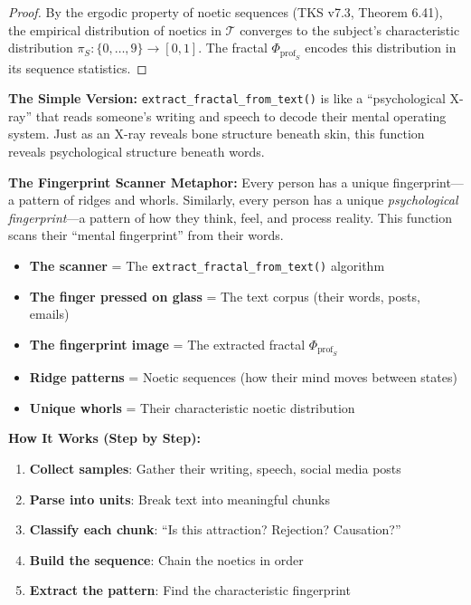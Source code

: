 \documentclass[11pt,twoside]{book}
\newcommand{\ProfileFrac}{\Phi_{\mathrm{prof}}}
\newcommand{\TextCorpus}{\mathcal{T}}
\begin{document}
\begin{proof}
By the ergodic property of noetic sequences (TKS v7.3, Theorem 6.41), the empirical
distribution of noetics in $\TextCorpus$ converges to the subject's characteristic
distribution $\pi_S : \{0, \ldots, 9\} \to [0,1]$. The fractal $\ProfileFrac_S$ encodes
this distribution in its sequence statistics.
\end{proof}

\begin{tcolorbox}[colback=green!5!white,colframe=green!65!black,title=\textbf{Plain English: The ``Mind-Reading Machine''},breakable]

\textbf{The Simple Version:}
\texttt{extract\_fractal\_from\_text()} is like a ``psychological X-ray'' that reads someone's
writing and speech to decode their mental operating system. Just as an X-ray reveals bone
structure beneath skin, this function reveals psychological structure beneath words.

\textbf{The Fingerprint Scanner Metaphor:}
Every person has a unique fingerprint---a pattern of ridges and whorls. Similarly, every
person has a unique \textit{psychological fingerprint}---a pattern of how they think, feel,
and process reality. This function scans their ``mental fingerprint'' from their words.

\begin{itemize}
    \item \textbf{The scanner} = The \texttt{extract\_fractal\_from\_text()} algorithm
    \item \textbf{The finger pressed on glass} = The text corpus (their words, posts, emails)
    \item \textbf{The fingerprint image} = The extracted fractal $\ProfileFrac_S$
    \item \textbf{Ridge patterns} = Noetic sequences (how their mind moves between states)
    \item \textbf{Unique whorls} = Their characteristic noetic distribution
\end{itemize}

\textbf{How It Works (Step by Step):}
\begin{enumerate}
    \item \textbf{Collect samples}: Gather their writing, speech, social media posts
    \item \textbf{Parse into units}: Break text into meaningful chunks
    \item \textbf{Classify each chunk}: ``Is this attraction? Rejection? Causation?''
    \item \textbf{Build the sequence}: Chain the noetics in order
    \item \textbf{Extract the pattern}: Find the characteristic fingerprint
\end{enumerate}


\end{tcolorbox}
\end{document}

